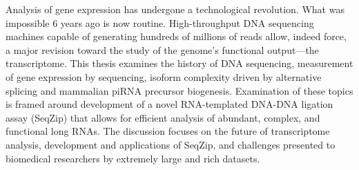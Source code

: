 \label{hd:abstract}
\abstract{}

Analysis of gene expression has undergone a technological revolution. What was impossible 6 years ago is now routine. High-throughput DNA sequencing machines capable of generating hundreds of millions of reads allow, indeed force, a major revision toward the study of the genome's functional output---the transcriptome. This thesis examines the history of DNA sequencing, measurement of gene expression by sequencing, isoform complexity driven by alternative splicing and mammalian piRNA precursor biogenesis. Examination of these topics is framed around development of a novel RNA-templated DNA-DNA ligation assay (SeqZip) that allows for efficient analysis of abundant, complex, and functional long RNAs. The discussion focuses on the future of transcriptome analysis, development and applications of SeqZip, and challenges presented to biomedical researchers by extremely large and rich datasets.

\setcounter{page}{3}
\clearpage %